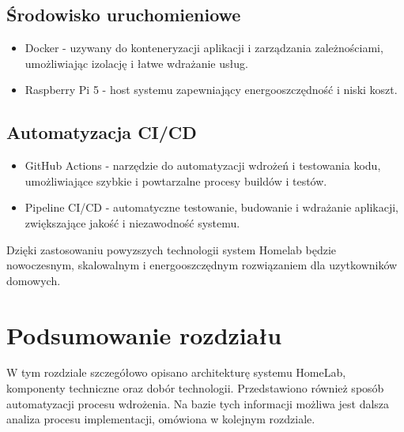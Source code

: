 \subsection{Środowisko uruchomieniowe}
\begin{itemize}
    \item Docker - uzywany do konteneryzacji aplikacji i zarządzania zależnościami, umożliwiając izolację i łatwe wdrażanie usług.
    \item Raspberry Pi 5 - host systemu zapewniający energooszczędność i niski koszt.
\end{itemize}
\subsection{Automatyzacja CI/CD}
\begin{itemize}
    \item GitHub Actions - narzędzie do automatyzacji wdrożeń i testowania kodu, umożliwiające szybkie i powtarzalne procesy buildów i testów.
    \item Pipeline CI/CD - automatyczne testowanie, budowanie i wdrażanie aplikacji, zwiększające jakość i niezawodność systemu.
\end{itemize}

Dzięki zastosowaniu powyzszych technologii system Homelab będzie nowoczesnym, skalowalnym i energooszczędnym rozwiązaniem dla uzytkowników domowych.

\section{Podsumowanie rozdziału}
W tym rozdziale szczegółowo opisano architekturę systemu HomeLab, komponenty techniczne oraz dobór technologii. Przedstawiono również sposób automatyzacji procesu wdrożenia. Na bazie tych informacji możliwa jest dalsza analiza procesu implementacji, omówiona w kolejnym rozdziale.